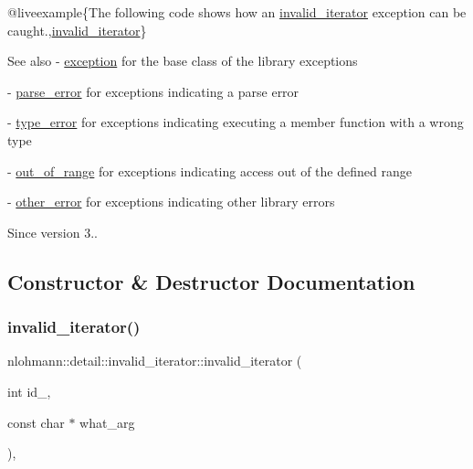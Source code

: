 @liveexample\{The following code shows how an {\ttfamily \mbox{\hyperlink{classnlohmann_1_1detail_1_1invalid__iterator}{invalid\+\_\+iterator}}} exception can be caught.,\mbox{\hyperlink{classnlohmann_1_1detail_1_1invalid__iterator}{invalid\+\_\+iterator}}\}

\begin{DoxySeeAlso}{See also}
-\/ \mbox{\hyperlink{classnlohmann_1_1detail_1_1exception}{exception}} for the base class of the library exceptions 

-\/ \mbox{\hyperlink{classnlohmann_1_1detail_1_1parse__error}{parse\+\_\+error}} for exceptions indicating a parse error 

-\/ \mbox{\hyperlink{classnlohmann_1_1detail_1_1type__error}{type\+\_\+error}} for exceptions indicating executing a member function with a wrong type 

-\/ \mbox{\hyperlink{classnlohmann_1_1detail_1_1out__of__range}{out\+\_\+of\+\_\+range}} for exceptions indicating access out of the defined range 

-\/ \mbox{\hyperlink{classnlohmann_1_1detail_1_1other__error}{other\+\_\+error}} for exceptions indicating other library errors
\end{DoxySeeAlso}
\begin{DoxySince}{Since}
version 3.. 
\end{DoxySince}


\subsection{Constructor \& Destructor Documentation}
\mbox{\label{classnlohmann_1_1detail_1_1invalid__iterator_adf4a6697420f3bddb4addfc0b98f6ee2}} 
\subsubsection{\texorpdfstring{invalid\_iterator()}{invalid\_iterator()}}
{\footnotesize\ttfamily nlohmann\+::detail\+::invalid\+\_\+iterator\+::invalid\+\_\+iterator (\begin{DoxyParamCaption}\item[{int}]{id\+\_\+,  }\item[{const char $\ast$}]{what\+\_\+arg }\end{DoxyParamCaption})\hspace{0.3cm}{\ttfamily [inline]}, {\ttfamily [private]}}



